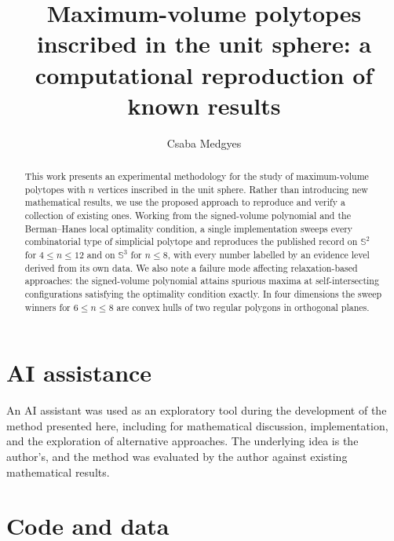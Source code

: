 \documentclass[11pt,reqno]{amsart}
\title[Maximum-volume inscribed polytopes]
      {Maximum-volume polytopes inscribed in the unit sphere:
       a computational reproduction of known results}
\author{Csaba Medgyes}
\newcounter{artifact}
\theoremstyle{definition}
\begin{document}
\begin{abstract}
  This work presents an experimental methodology for the study of
  maximum-volume polytopes with $n$ vertices inscribed in the unit sphere.
  Rather than introducing new mathematical results, we use the proposed
  approach to reproduce and verify a collection of existing ones. Working from
  the signed-volume polynomial and the Berman--Hanes local optimality condition, a
  single implementation sweeps every combinatorial type of simplicial polytope
  and reproduces the published record on $\mathbb{S}^{2}$ for
  $4 \leq n \leq 12$ and on $\mathbb{S}^{3}$ for $n \leq 8$, with every number
  labelled by an evidence level derived from its own data. We also note a
  failure mode affecting relaxation-based approaches: the signed-volume
  polynomial attains spurious maxima at self-intersecting configurations
  satisfying the optimality condition exactly. In four dimensions the sweep
  winners for $6 \leq n \leq 8$ are convex hulls of two regular polygons in
  orthogonal planes.
\end{abstract}

\maketitle








\section*{AI assistance}

An AI assistant was used as an exploratory tool during the development of the
method presented here, including for mathematical discussion, implementation,
and the exploration of alternative approaches. The underlying idea is the
author's, and the method was evaluated by the author against existing
mathematical results.

\section*{Code and data}
\label{sec:artifacts}
\end{document}
